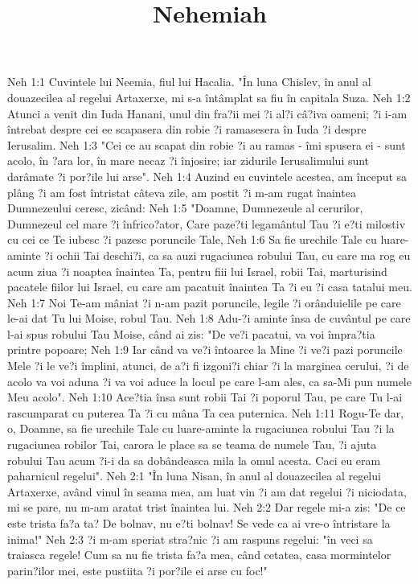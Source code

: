 

\title{Nehemiah}

Neh 1:1  Cuvintele lui Neemia, fiul lui Hacalia. "În luna Chislev, în anul al douazecilea al regelui Artaxerxe, mi s-a întâmplat sa fiu în capitala Suza.
Neh 1:2  Atunci a venit din Iuda Hanani, unul din fra?ii mei ?i al?i câ?iva oameni; ?i i-am întrebat despre cei ee scapasera din robie ?i ramasesera în Iuda ?i despre Ierusalim.
Neh 1:3  "Cei ce au scapat din robie ?i au ramas - îmi spusera ei - sunt acolo, în ?ara lor, în mare necaz ?i înjosire; iar zidurile Ierusalimului sunt darâmate ?i por?ile lui arse".
Neh 1:4  Auzind eu cuvintele acestea, am început sa plâng ?i am fost întristat câteva zile, am postit ?i m-am rugat înaintea Dumnezeului ceresc, zicând:
Neh 1:5  "Doamne, Dumnezeule al cerurilor, Dumnezeul cel mare ?i înfrico?ator, Care paze?ti legamântul Tau ?i e?ti milostiv cu cei ce Te iubesc ?i pazesc poruncile Tale,
Neh 1:6  Sa fie urechile Tale cu luare-aminte ?i ochii Tai deschi?i, ca sa auzi rugaciunea robului Tau, cu care ma rog eu acum ziua ?i noaptea înaintea Ta, pentru fiii lui Israel, robii Tai, marturisind pacatele fiilor lui Israel, cu care am pacatuit înaintea Ta ?i eu ?i casa tatalui meu.
Neh 1:7  Noi Te-am mâniat ?i n-am pazit poruncile, legile ?i orânduielile pe care le-ai dat Tu lui Moise, robul Tau.
Neh 1:8  Adu-?i aminte însa de cuvântul pe care l-ai spus robului Tau Moise, când ai zis: "De ve?i pacatui, va voi împra?tia printre popoare;
Neh 1:9  Iar când va ve?i întoarce la Mine ?i ve?i pazi poruncile Mele ?i le ve?i împlini, atunci, de a?i fi izgoni?i chiar ?i la marginea cerului, ?i de acolo va voi aduna ?i va voi aduce la locul pe care l-am ales, ca sa-Mi pun numele Meu acolo".
Neh 1:10  Ace?tia însa sunt robii Tai ?i poporul Tau, pe care Tu l-ai rascumparat cu puterea Ta ?i cu mâna Ta cea puternica.
Neh 1:11  Rogu-Te dar, o, Doamne, sa fie urechile Tale cu luare-aminte la rugaciunea robului Tau ?i la rugaciunea robilor Tai, carora le place sa se teama de numele Tau, ?i ajuta robului Tau acum ?i-i da sa dobândeasca mila la omul acesta. Caci eu eram paharnicul regelui".
Neh 2:1  "În luna Nisan, în anul al douazecilea al regelui Artaxerxe, având vinul în seama mea, am luat vin ?i am dat regelui ?i niciodata, mi se pare, nu m-am aratat trist înaintea lui.
Neh 2:2  Dar regele mi-a zis: "De ce este trista fa?a ta? De bolnav, nu e?ti bolnav! Se vede ca ai vre-o întristare la inima!"
Neh 2:3  ?i m-am speriat stra?nic ?i am raspuns regelui: "în veci sa traiasca regele! Cum sa nu fie trista fa?a mea, când cetatea, casa mormintelor parin?ilor mei, este pustiita ?i por?ile ei arse cu foc!"

